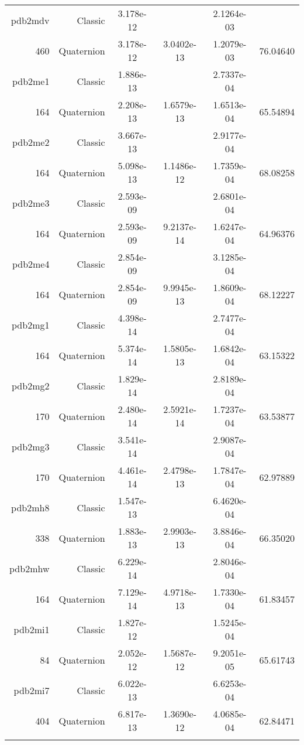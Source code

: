 \begin{xltabular}{\textwidth}{r|rS[table-format=1.3e+2]S[table-format=1.4e+2]S[table-format=1.4e+2]S[table-format=-1.5]}
pdb2mdv & Classic & 3.178e-12 &  & 2.1264e-03 & \\
460 & Quaternion & 3.178e-12 & 3.0402e-13 & 1.2079e-03 & 76.04640\\  \addlinespace
pdb2me1 & Classic & 1.886e-13 &  & 2.7337e-04 & \\
164 & Quaternion & 2.208e-13 & 1.6579e-13 & 1.6513e-04 & 65.54894\\  \addlinespace
pdb2me2 & Classic & 3.667e-13 &  & 2.9177e-04 & \\
164 & Quaternion & 5.098e-13 & 1.1486e-12 & 1.7359e-04 & 68.08258\\  \addlinespace
pdb2me3 & Classic & 2.593e-09 &  & 2.6801e-04 & \\
164 & Quaternion & 2.593e-09 & 9.2137e-14 & 1.6247e-04 & 64.96376\\  \addlinespace
pdb2me4 & Classic & 2.854e-09 &  & 3.1285e-04 & \\
164 & Quaternion & 2.854e-09 & 9.9945e-13 & 1.8609e-04 & 68.12227\\  \addlinespace
pdb2mg1 & Classic & 4.398e-14 &  & 2.7477e-04 & \\
164 & Quaternion & 5.374e-14 & 1.5805e-13 & 1.6842e-04 & 63.15322\\  \addlinespace
pdb2mg2 & Classic & 1.829e-14 &  & 2.8189e-04 & \\
170 & Quaternion & 2.480e-14 & 2.5921e-14 & 1.7237e-04 & 63.53877\\  \addlinespace
pdb2mg3 & Classic & 3.541e-14 &  & 2.9087e-04 & \\
170 & Quaternion & 4.461e-14 & 2.4798e-13 & 1.7847e-04 & 62.97889\\  \addlinespace
pdb2mh8 & Classic & 1.547e-13 &  & 6.4620e-04 & \\
338 & Quaternion & 1.883e-13 & 2.9903e-13 & 3.8846e-04 & 66.35020\\  \addlinespace
pdb2mhw & Classic & 6.229e-14 &  & 2.8046e-04 & \\
164 & Quaternion & 7.129e-14 & 4.9718e-13 & 1.7330e-04 & 61.83457\\  \addlinespace
pdb2mi1 & Classic & 1.827e-12 &  & 1.5245e-04 & \\
84 & Quaternion & 2.052e-12 & 1.5687e-12 & 9.2051e-05 & 65.61743\\  \addlinespace
pdb2mi7 & Classic & 6.022e-13 &  & 6.6253e-04 & \\
404 & Quaternion & 6.817e-13 & 1.3690e-12 & 4.0685e-04 & 62.84471\\  \addlinespace

\end{xltabular}
